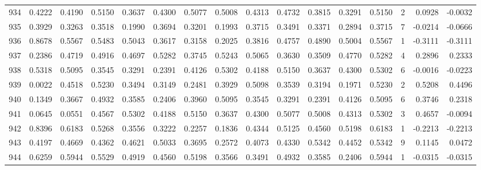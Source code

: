 \begin{tabular}{lrrrrrrrrrrrrrrr}
934 &      0.4222 &  0.4190 &  0.5150 &  0.3637 &  0.4300 &  0.5077 &  0.5008 &  0.4313 &  0.4732 &  0.3815 &   0.3291 &     0.5150 &      2 &                    0.0928 &                    -0.0032 \\
935 &      0.3929 &  0.3263 &  0.3518 &  0.1990 &  0.3694 &  0.3201 &  0.1993 &  0.3715 &  0.3491 &  0.3371 &   0.2894 &     0.3715 &      7 &                   -0.0214 &                    -0.0666 \\
936 &      0.8678 &  0.5567 &  0.5483 &  0.5043 &  0.3617 &  0.3158 &  0.2025 &  0.3816 &  0.4757 &  0.4890 &   0.5004 &     0.5567 &      1 &                   -0.3111 &                    -0.3111 \\
937 &      0.2386 &  0.4719 &  0.4916 &  0.4697 &  0.5282 &  0.3745 &  0.5243 &  0.5065 &  0.3630 &  0.3509 &   0.4770 &     0.5282 &      4 &                    0.2896 &                     0.2333 \\
938 &      0.5318 &  0.5095 &  0.3545 &  0.3291 &  0.2391 &  0.4126 &  0.5302 &  0.4188 &  0.5150 &  0.3637 &   0.4300 &     0.5302 &      6 &                   -0.0016 &                    -0.0223 \\
939 &      0.0022 &  0.4518 &  0.5230 &  0.3494 &  0.3149 &  0.2481 &  0.3929 &  0.5098 &  0.3539 &  0.3194 &   0.1971 &     0.5230 &      2 &                    0.5208 &                     0.4496 \\
940 &      0.1349 &  0.3667 &  0.4932 &  0.3585 &  0.2406 &  0.3960 &  0.5095 &  0.3545 &  0.3291 &  0.2391 &   0.4126 &     0.5095 &      6 &                    0.3746 &                     0.2318 \\
941 &      0.0645 &  0.0551 &  0.4567 &  0.5302 &  0.4188 &  0.5150 &  0.3637 &  0.4300 &  0.5077 &  0.5008 &   0.4313 &     0.5302 &      3 &                    0.4657 &                    -0.0094 \\
942 &      0.8396 &  0.6183 &  0.5268 &  0.3556 &  0.3222 &  0.2257 &  0.1836 &  0.4344 &  0.5125 &  0.4560 &   0.5198 &     0.6183 &      1 &                   -0.2213 &                    -0.2213 \\
943 &      0.4197 &  0.4669 &  0.4362 &  0.4621 &  0.5033 &  0.3695 &  0.2572 &  0.4073 &  0.4330 &  0.5342 &   0.4452 &     0.5342 &      9 &                    0.1145 &                     0.0472 \\
944 &      0.6259 &  0.5944 &  0.5529 &  0.4919 &  0.4560 &  0.5198 &  0.3566 &  0.3491 &  0.4932 &  0.3585 &   0.2406 &     0.5944 &      1 &                   -0.0315 &                    -0.0315 \\

\end{tabular}

